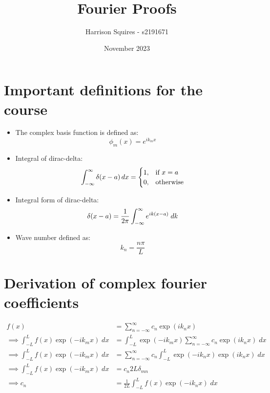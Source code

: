\documentclass{article}
\title{Fourier Proofs}
\author{Harrison Squires - s2191671}
\date{November 2023}
\begin{document}
\maketitle
\thispagestyle{empty}



\tableofcontents
\thispagestyle{empty}



\newpage
\clearpage
{} 
\section{Important definitions for the course}
\begin{itemize}
\item
The complex basis function is defined as:
\begin{equation*}
    \phi_m (x)=e^{ik_mx}
\end{equation*}
\item 
Integral of dirac-delta:
\begin{equation*}
\int_{-\infty}^{\infty} \delta(x - a) \, dx = \begin{cases} 1, & \text{if } x = a \\ 0, & \text{otherwise} \end{cases}
\end{equation*}

\item 
Integral form of dirac-delta:
\begin{equation} \label{eq:IFDD}
    \delta(x-a) = \frac{1}{2\pi}\int_{-\infty}^{\infty} e^{ik(x-a)}\;dk
\end{equation}

\item
Wave number defined as:
\begin{equation*}
    k_n = \frac{n\pi}{L}
\end{equation*}

\end{itemize}
\newpage
\section{Derivation of complex fourier coefficients}
\begin{align}
    f(x) &= \sum_{n=-\infty}^\infty c_n\exp(ik_nx) \label{complexcoef}\\ 
    \implies \int_{-L}^L f(x)\exp(-ik_mx)\;dx&=\int_{-L}^L \exp(-ik_mx)\sum_{n=-\infty}^\infty c_n\exp(ik_nx)\;dx \label{complexcoef2}\\
    \implies  \int_{-L}^L f(x)\exp(-ik_mx)\;dx&=\sum_{n=-\infty}^\infty c_n\int_{-L}^L \exp(-ik_nx)\exp(ik_nx) \; dx\\
    \implies  \int_{-L}^L f(x)\exp(-ik_mx)\;dx&=c_n 2L\delta_{mn}\\
    \implies c_n  &= \frac{1}{2L}\int_{-L}^Lf(x)\exp(-ik_nx)\;dx \label{complexcoefflast}
\end{align}
\end{document}
